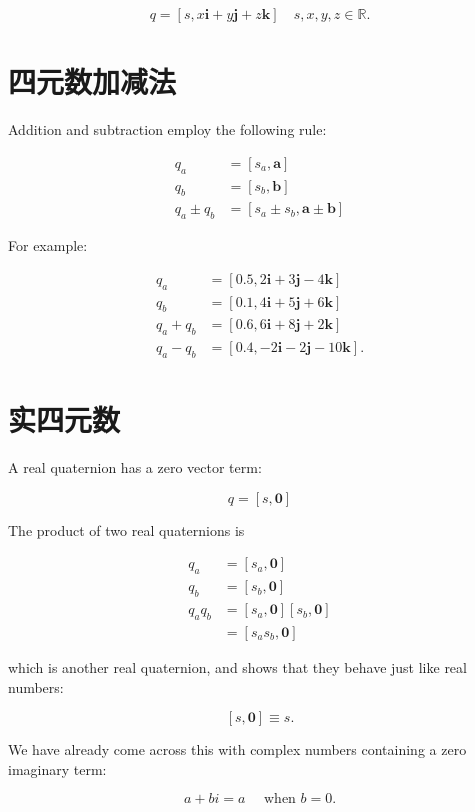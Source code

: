 $$
q=[s, x \mathbf{i}+y \mathbf{j}+z \mathbf{k}] \quad s, x, y, z \in \mathbb{R} .
$$

\section{四元数加减法}
Addition and subtraction employ the following rule:

$$
\begin{aligned}
q_{a} & =\left[s_{a}, \mathbf{a}\right] \\
q_{b} & =\left[s_{b}, \mathbf{b}\right] \\
q_{a} \pm q_{b} & =\left[s_{a} \pm s_{b}, \mathbf{a} \pm \mathbf{b}\right]
\end{aligned}
$$

For example:

$$
\begin{aligned}
q_{a} & =[0.5,2 \mathbf{i}+3 \mathbf{j}-4 \mathbf{k}] \\
q_{b} & =[0.1,4 \mathbf{i}+5 \mathbf{j}+6 \mathbf{k}] \\
q_{a}+q_{b} & =[0.6,6 \mathbf{i}+8 \mathbf{j}+2 \mathbf{k}] \\
q_{a}-q_{b} & =[0.4,-2 \mathbf{i}-2 \mathbf{j}-10 \mathbf{k}] .
\end{aligned}
$$

\section{实四元数}
A real quaternion has a zero vector term:

$$
q=[s, \mathbf{0}]
$$

The product of two real quaternions is

$$
\begin{aligned}
q_{a} & =\left[s_{a}, \mathbf{0}\right] \\
q_{b} & =\left[s_{b}, \mathbf{0}\right] \\
q_{a} q_{b} & =\left[s_{a}, \mathbf{0}\right]\left[s_{b}, \mathbf{0}\right] \\
& =\left[s_{a} s_{b}, \mathbf{0}\right]
\end{aligned}
$$

which is another real quaternion, and shows that they behave just like real numbers:

$$
[s, \mathbf{0}] \equiv s .
$$

We have already come across this with complex numbers containing a zero imaginary term:

$$
a+b i=a \quad \text { when } b=0 .
$$

